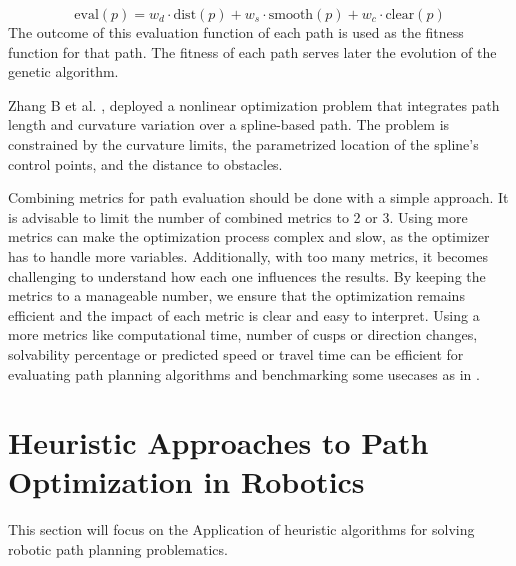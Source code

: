 \begin{equation}
    \text{eval}(p) = w_d \cdot \text{dist}(p) + w_s \cdot \text{smooth}(p) + w_c \cdot \text{clear}(p)
    \label{evaluation}
\end{equation}
The outcome of this evaluation function of each path is used as the fitness function for that path.
The fitness of each path serves later the evolution of the genetic algorithm.

Zhang B et al. \cite{R36}, deployed a nonlinear optimization problem that integrates path length and 
curvature variation over a spline-based path. The problem is constrained by the curvature limits, the 
parametrized location of the spline's control points, and the distance to obstacles.

Combining metrics for path evaluation should be done with a simple approach. It is advisable to limit 
the number of combined metrics to 2 or 3. Using more metrics can make the optimization process complex 
and slow, as the optimizer has to handle more variables. Additionally, with too many metrics, it becomes 
challenging to understand how each one influences the results. By keeping the metrics to a 
manageable number, we ensure that the optimization remains efficient and the impact of each metric 
is clear and easy to interpret. 
Using a more metrics like computational time, number of cusps or direction changes, solvability percentage
or predicted speed or travel time can be efficient for evaluating path planning algorithms and benchmarking some
usecases as in \cite{R23}.

\newpage

\section{Heuristic Approaches to Path Optimization in Robotics}
This section will focus on the Application of heuristic algorithms for solving robotic path planning 
problematics. 

